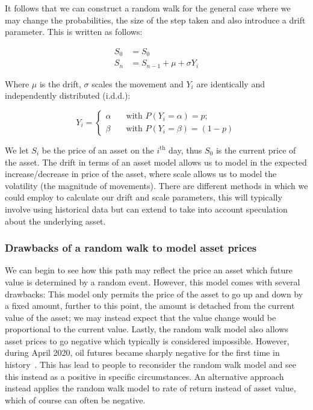 It follows that we can construct a random walk for the general case where we may change the probabilities, the size of the step taken and also introduce a drift parameter. This is written as follows:

\begin{align*}
    S_0 &= S_0 \\
    S_n &= S_{n-1} + \mu + \sigma Y_i
\end{align*}

Where \(\mu \) is the drift, \(\sigma \) scales the movement and \(Y_i\) are identically and independently distributed (i.d.d.):

\begin{equation*}
    Y_i = 
    \begin{cases}
       \alpha& \quad \text{with } P(Y_i = \alpha) = p; \\
       \beta& \quad \text{with } P(Y_i = \beta) = (1-p)
    \end{cases}
\end{equation*}

We let \(S_i \) be the price of an asset on the \(i^{\text{th}}\) day, thus \(S_0\) is the current price of the asset. The drift in terms of an asset model allows us to model in the expected increase/decrease in price of the asset, where scale allows us to model the volatility (the magnitude of movements). There are different methods in which we could employ to calculate our drift and scale parameters, this will typically involve using historical data but can extend to take into account speculation about the underlying asset.

\subsubsection{Drawbacks of a random walk to model asset prices}

We can begin to see how this path may reflect the price an asset which future value is determined by a random event. However, this model comes with several drawbacks: This model only permits the price of the asset to go up and down by a fixed amount, further to this point, the amount is detached from the current value of the asset; we may instead expect that the value change would be proportional to the current value. Lastly, the random walk model also allows asset prices to go negative which typically is considered impossible. However, during April 2020, oil futures became sharply negative for the first time in history~\cite{NegativeOil}. This has lead to people to reconsider the random walk model and see this instead as a positive in specific circumstances. An alternative approach instead applies the random walk model to rate of return instead of asset value, which of course can often be negative.

